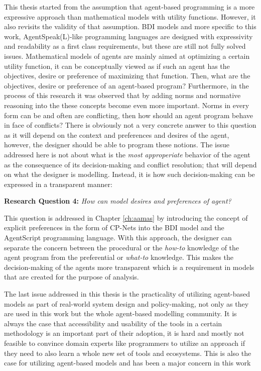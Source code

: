 This thesis started from the assumption that agent-based programming is a more expressive approach than mathematical models with utility functions. However, it also revisits the validity of that assumption. BDI models and more specific to this work, AgentSpeak(L)-like programming languages are designed with expressivity and readability as a first class requirements, but these are still not fully solved issues. Mathematical models of agents are mainly aimed at optimizing a certain utility function, it can be conceptually viewed as if such an agent has the objectives, desire or preference of maximizing that function. Then, what are the objectives, desire or preference of an agent-based program? Furthermore, in the process of this research it was observed that by adding norms and normative reasoning into the these concepts become even more important. Norms in every form can be and often are conflicting, then how should an agent program behave in face of conflicts? There is obviously not a very concrete answer to this question as it will depend on the context and preferences and desires of the agent, however, the designer should be able to program these notions. The issue addressed here is not about what is the \textit{most approperiate} behavior of the agent as the consequence of its decision-making and conflict resolution; that will depend on what the designer is modelling. Instead, it is how such decision-making can be expressed in a transparent manner:

\textbf{Research Question 4:} \textit{How can model desires and preferences of agent?}

This question is addressed in Chapter \ref{ch:aamas} by introducing the concept of explicit preferences in the form of CP-Nets into the BDI model and the AgentScript programming language. With this approach, the designer can separate the concern between the procedural or the \textit{how-to} knowledge of the agent program from the preferential or \textit{what-to} knowledge. This makes the decision-making of the agents more transparent which is a requirement in models that are created for the purpose of analysis. 

The last issue addressed in this thesis is the practicality of utilizing agent-based models as part of real-world system design and policy-making, not only as they are used in this work but the whole agent-based modelling community. It is always the case that accessibility and usability of the tools in a certain methodology is an important part of their adoption, it is hard and mostly not feasible to convince domain experts like programmers to utilize an approach if they need to also learn a whole new set of tools and ecosystems. This is also the case for utilizing agent-based models and has been a major concern in this work

